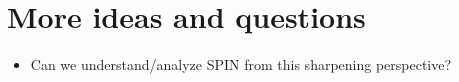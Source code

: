 \documentclass{article}
\begin{document}
\begin{comment}
    weights/regret-type reasoning above?
  \item Possible idea: Try to argue that we're converging to argmax
    policy in KL/TV distance (via descent lemma-type reasoning?)
  \item Focus on CB case with general $f$ class---vanilla bandit is
    too easy, but this is rich enough to be interesting.
    \begin{itemize}
    \item Idea: Argue that if $\fstar$ has a uniform margin,
      $\fhat\ind{1}$ also has a uniform margin on most $x$s. Then try
      to directly use properties of exp weights updates to argue that
      each update preserves the margin on most $x$s?
    \end{itemize}
  \item Seems like optimization view might be useful here: Argue that
    argmax policy is a local optima, then argue that we converge to it
    in TV? 
  \item Perhaps the easiest way to import the optimization view is to
    handle the CB case, but where $\Pi$ is all possible
    policies. Still have stat errors, but not entirely non-trivial? Or
    maybe it is since we are basically doing the bandit case pointwise
    when $n\gg\log\abs{\Pi}$.
  \end{itemize}
\end{itemize}
\end{comment}

\section{More ideas and questions}
\begin{itemize}
\item Can we understand/analyze SPIN from this sharpening perspective?
\end{itemize}

 
\end{document}
